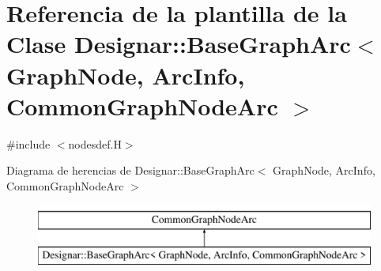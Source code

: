\hypertarget{class_designar_1_1_base_graph_arc}{}\section{Referencia de la plantilla de la Clase Designar\+:\+:Base\+Graph\+Arc$<$ Graph\+Node, Arc\+Info, Common\+Graph\+Node\+Arc $>$}
\label{class_designar_1_1_base_graph_arc}


{\ttfamily \#include $<$nodesdef.\+H$>$}

Diagrama de herencias de Designar\+:\+:Base\+Graph\+Arc$<$ Graph\+Node, Arc\+Info, Common\+Graph\+Node\+Arc $>$\begin{figure}[H]
\begin{center}
\leavevmode
\includegraphics[height=2.000000cm]{class_designar_1_1_base_graph_arc}
\end{center}
\end{figure}
